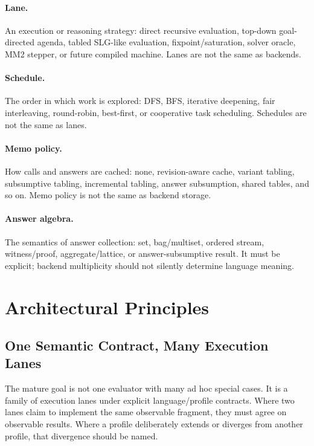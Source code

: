 \documentclass[11pt]{article}
\newcommand{\MM}{MM2}
\begin{document}
\paragraph{Lane.}  An execution or reasoning strategy: direct recursive evaluation, top-down goal-directed agenda, tabled SLG-like evaluation, fixpoint/saturation, solver oracle, \MM{} stepper, or future compiled machine.  Lanes are not the same as backends.

\paragraph{Schedule.}  The order in which work is explored: DFS, BFS, iterative deepening, fair interleaving, round-robin, best-first, or cooperative task scheduling.  Schedules are not the same as lanes.

\paragraph{Memo policy.}  How calls and answers are cached: none, revision-aware cache, variant tabling, subsumptive tabling, incremental tabling, answer subsumption, shared tables, and so on.  Memo policy is not the same as backend storage.

\paragraph{Answer algebra.}  The semantics of answer collection: set, bag/multiset, ordered stream, witness/proof, aggregate/lattice, or answer-subsumptive result.  It must be explicit; backend multiplicity should not silently determine language meaning.

\section{Architectural Principles}

\subsection{One Semantic Contract, Many Execution Lanes}

The mature goal is not one evaluator with many ad hoc special cases.  It is a family of execution lanes under explicit language/profile contracts.  Where two lanes claim to implement the same observable fragment, they must agree on observable results.  Where a profile deliberately extends or diverges from another profile, that divergence should be named.
\end{document}
